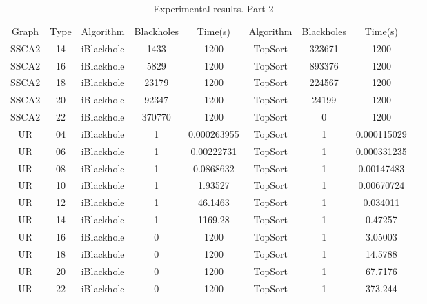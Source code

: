 \begin{table}[]
	\caption{Experimental results. Part 2}
	\label{tabular:tableresults2}
	\begin{center}
		\begin{tabular}{c|c|c|c|c|c|c|c|c}
			Graph & Type & Algorithm & Blackholes & Time(s) & Algorithm & Blackholes & Time(s) \\
			SSCA2 & 14 & iBlackhole & 1433 & 1200 & TopSort & 323671 & 1200 \\
			SSCA2 & 16 & iBlackhole & 5829 & 1200 & TopSort & 893376 & 1200 \\
			SSCA2 & 18 & iBlackhole & 23179 & 1200 & TopSort & 224567 & 1200 \\
			SSCA2 & 20 & iBlackhole & 92347 & 1200 & TopSort & 24199 & 1200 \\
			SSCA2 & 22 & iBlackhole & 370770 & 1200 & TopSort & 0 & 1200 \\
			UR & 04 & iBlackhole & 1 & 0.000263955 & TopSort & 1 & 0.000115029 \\
			UR & 06 & iBlackhole & 1 & 0.00222731 & TopSort & 1 & 0.000331235 \\
			UR & 08 & iBlackhole & 1 & 0.0868632 & TopSort & 1 & 0.00147483 \\
			UR & 10 & iBlackhole & 1 & 1.93527 & TopSort & 1 & 0.00670724 \\
			UR & 12 & iBlackhole & 1 & 46.1463 & TopSort & 1 & 0.034011 \\
			UR & 14 & iBlackhole & 1 & 1169.28 & TopSort & 1 & 0.47257 \\
			UR & 16 & iBlackhole & 0 & 1200 & TopSort & 1 & 3.05003 \\
			UR & 18 & iBlackhole & 0 & 1200 & TopSort & 1 & 14.5788 \\
			UR & 20 & iBlackhole & 0 & 1200 & TopSort & 1 & 67.7176 \\
			UR & 22 & iBlackhole & 0 & 1200 & TopSort & 1 & 373.244 \\
		\end{tabular}
	\end{center}
\end{table}

